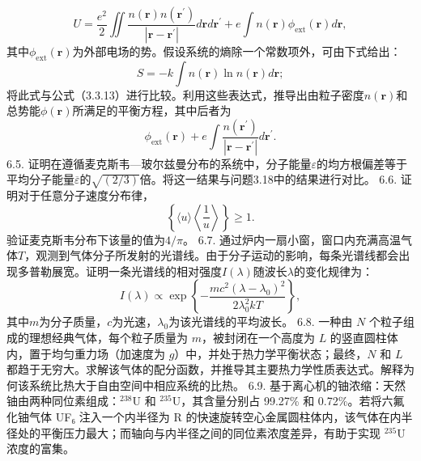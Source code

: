 \begin{equation}\tag{6.6.18}\label{eq:6.6.18}
U = \frac { e ^{2} } { 2 } \iint \frac { n ( \pmb { r } ) n ( \pmb { r } ^{\prime} ) } { | \pmb { r } - \pmb { r } ^{\prime} | } d \pmb { r } d \pmb { r } ^{\prime} + e \int n ( \pmb { r } ) \phi _ { \mathrm { e x t } } ( \pmb { r } ) d \pmb { r } ,
\end{equation}
其中\(\phi_{\mathrm{ext}}(\boldsymbol{r})\)为外部电场的势。假设系统的熵除一个常数项外，可由下式给出：
\begin{equation}\tag{6.6.19}\label{eq:6.6.19}
S = - k \int n ( \mathbf { r } ) \ln n ( \mathbf { r } ) d \mathbf { r } ;
\end{equation}
将此式与公式（3.3.13）进行比较。利用这些表达式，推导出由粒子密度\(n(\boldsymbol{r})\)和总势能\(\phi(\boldsymbol{r})\)所满足的平衡方程，其中后者为
\begin{equation}\tag{6.6.20}\label{eq:6.6.20}
\phi _ { \mathrm { e x t } } ( \pmb { r } ) + e \int \frac { n ( \pmb { r } ^{\prime} ) } { | \pmb { r } - \pmb { r } ^{\prime} | } d \pmb { r } ^{\prime} .
\end{equation}
6.5. 证明在遵循麦克斯韦---玻尔兹曼分布的系统中，分子能量\(\varepsilon\)的均方根偏差等于平均分子能量\(\overline{\varepsilon}\)的\(\sqrt{(2/3)}\)倍。将这一结果与问题3.18中的结果进行对比。
6.6. 证明对于任意分子速度分布律，
\begin{equation}\tag{6.6.21}\label{eq:6.6.21}
\left\{ \langle u \rangle \left\langle \frac { 1 } { u } \right\rangle \right\} \geq 1 .
\end{equation}
验证麦克斯韦分布下该量的值为\(4/\pi\)。
6.7. 通过炉内一扇小窗，窗口内充满高温气体\(T\)，观测到气体分子所发射的光谱线。由于分子运动的影响，每条光谱线都会出现多普勒展宽。证明一条光谱线的相对强度\(I(\lambda)\)随波长\(\lambda\)的变化规律为：
\begin{equation}\tag{6.6.22}\label{eq:6.6.22}
I ( \lambda ) \propto \exp \left\{ - \frac { m c ^{2} ( \lambda - \lambda _ { 0 } ) ^{2} } { 2 \lambda _ { 0 } ^{2} k T } \right\} ,
\end{equation}
其中\(m\)为分子质量，\(c\)为光速，\(\lambda_{0}\)为该光谱线的平均波长。
6.8. 一种由 \(N\) 个粒子组成的理想经典气体，每个粒子质量为 \(m\)，被封闭在一个高度为 \(L\) 的竖直圆柱体内，置于均匀重力场（加速度为 \(g\)）中，并处于热力学平衡状态；最终，\(N\) 和 \(L\) 都趋于无穷大。求解该气体的配分函数，并推导其主要热力学性质表达式。解释为何该系统比热大于自由空间中相应系统的比热。
6.9. 基于离心机的铀浓缩：天然铀由两种同位素组成：\(^{238}\)U 和 \(^{235}\)U，其含量分别占 99.27\% 和 0.72\%。若将六氟化铀气体 UF₆ 注入一个内半径为 R 的快速旋转空心金属圆柱体内，该气体在内半径处的平衡压力最大；而轴向与内半径之间的同位素浓度差异，有助于实现 \(^{235}\)U 浓度的富集。
